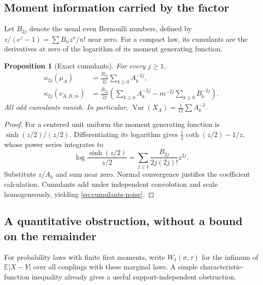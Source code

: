 \documentclass[11pt,a4paper]{article}
\newtheorem{proposition}[theorem]{Proposition}
\theoremstyle{definition}
\theoremstyle{remark}
\newcommand{\E}{\mathbb E}
\newcommand{\Var}{\operatorname{Var}}
\begin{document}
\subsection{Moment information carried by the factor}
Let $B_{2j}$ denote the usual even Bernoulli numbers, defined by
$z/(e^z-1)=\sum B_nz^n/n!$ near zero. For a compact law, its cumulants are
the derivatives at zero of the logarithm of its moment generating function.
\begin{proposition}[Exact cumulants]\label{prop:cumulants}
For every $j\ge1$,
\begin{align}
 \kappa_{2j}(\mu_A)&=\frac{B_{2j}}{2j}\sum_{k\ge0}A_k^{-2j},
 \label{eq:cumulants-law}\\
 \kappa_{2j}(\nu_{A,B,m})&=\frac{B_{2j}}{2j}
 \left(\sum_{k\ge0}A_k^{-2j}-m^{-2j}\sum_{k\ge0}B_k^{-2j}\right).
 \label{eq:cumulants-noise}
\end{align}
All odd cumulants vanish. In particular,
$\Var(X_A)=\frac1{12}\sum A_k^{-2}$.
\end{proposition}
\begin{proof}
For a centered unit uniform the moment generating function is
$\sinh(z/2)/(z/2)$. Differentiating its logarithm gives
$\frac12\coth(z/2)-1/z$, whose power series integrates to
\[
 \log\frac{\sinh(z/2)}{z/2}
 =\sum_{j\ge1}\frac{B_{2j}}{2j(2j)!}z^{2j}.
\]
Substitute $z/A_k$ and sum near zero. Normal convergence justifies the
coefficient calculation. Cumulants add under independent convolution and
scale homogeneously, yielding \eqref{eq:cumulants-noise}.
\end{proof}


\subsection{A quantitative obstruction, without a bound on the remainder}
For probability laws with finite first moments, write $W_1(\sigma,\tau)$
for the infimum of $\E|X-Y|$ over all couplings with these marginal laws.
A simple characteristic-function inequality already gives a useful
support-independent obstruction.
\end{document}

